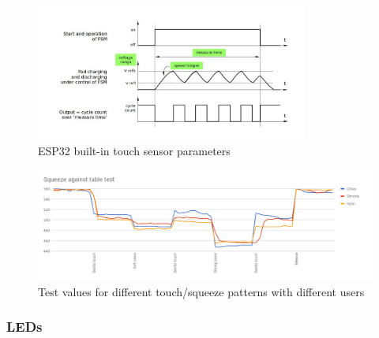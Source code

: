 \begin{figure}[ht]
    \centering
    \includegraphics[width=0.8\textwidth]{images/FW/touch_parameters.jpg}
    \caption{ESP32 built-in touch sensor parameters}
    \label{fig:esp_touchparameters}
\end{figure}

\begin{figure}[ht]
    \centering
    \includegraphics[width=\textwidth]{images/FW/capa_squeeze_table_multi.png}
    \caption{Test values for different touch/squeeze patterns with different users}
    \label{fig:esp_touchtest}
\end{figure}



\subsubsection{LEDs}\label{subsec:fw/Functions/LEDs}
    
